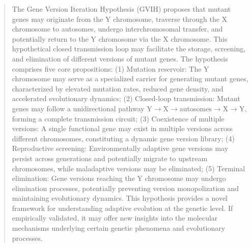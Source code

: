\documentclass{base}
\begin{document}
\nocite{*}





\printtitle
\printauthors

\begin{abstract}
The Gene Version Iteration Hypothesis (GVIH) proposes that mutant genes may originate from the Y chromosome, traverse through the X chromosome to autosomes, undergo interchromosomal transfer, and potentially return to the Y chromosome via the X chromosome. This hypothetical closed transmission loop may facilitate the storage, screening, and elimination of different versions of mutant genes. The hypothesis comprises five core propositions: (1) Mutation reservoir: The Y chromosome may serve as a specialized carrier for generating mutant genes, characterized by elevated mutation rates, reduced gene density, and accelerated evolutionary dynamics; (2) Closed-loop transmission: Mutant genes may follow a unidirectional pathway Y$\rightarrow$X$\rightarrow$autosomes$\rightarrow$X$\rightarrow$Y, forming a complete transmission circuit; (3) Coexistence of multiple versions: A single functional gene may exist in multiple versions across different chromosomes, constituting a dynamic gene version library; (4) Reproductive screening: Environmentally adaptive gene versions may persist across generations and potentially migrate to upstream chromosomes, while maladaptive versions may be eliminated; (5) Terminal elimination: Gene versions reaching the Y chromosome may undergo elimination processes, potentially preventing version monopolization and maintaining evolutionary dynamics. This hypothesis provides a novel framework for understanding adaptive evolution at the genetic level. If empirically validated, it may offer new insights into the molecular mechanisms underlying certain genetic phenomena and evolutionary processes.
\end{abstract}
\end{document}
